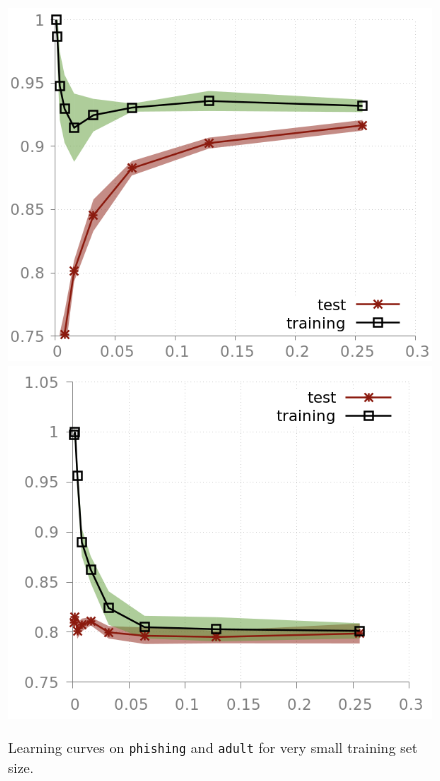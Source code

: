 \documentclass[preprint,12pt]{elsarticle}
\theoremstyle{definition}
\begin{document}
\begin{figure}[!h]\centering
\includegraphics[scale=0.3]{img/learning_curve_phishing_zoom.png}
\hfill
\includegraphics[scale=0.3]{img/learning_curve_adult_zoom.png}
\caption{Learning curves on \texttt{phishing} and \texttt{adult} for very small training set size.}
\label{fig:learning_curve_5}
\end{figure}
\end{document}
